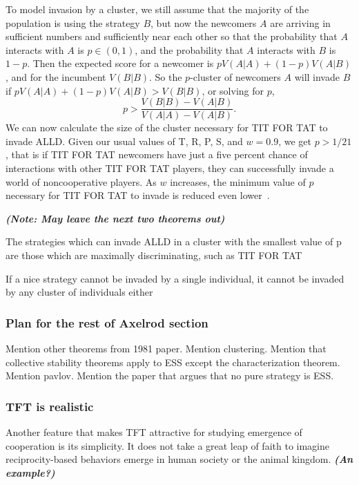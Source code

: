 To model invasion by a cluster, we still assume that the majority of the population is using the strategy $B$, but now the newcomers $A$ are arriving in sufficient numbers and sufficiently near each other so that the probability that $A$ interacts with $A$ is $p \in (0, 1)$, and the probability that $A$ interacts with $B$ is $1-p$. Then the expected score for a newcomer is $pV(A | A) + (1-p) V(A | B)$, and for the incumbent $V(B | B)$. So the $p$-cluster of newcomers $A$ will invade $B$ if $pV(A | A) + (1-p) V(A | B) > V(B|B)$, or solving for $p$,
\[
p > \frac{V(B|B) - V(A|B)}{V(A|A) - V(A|B)}.
\]
We can now calculate the size of the cluster necessary for TIT FOR TAT to invade ALLD. Given our usual values of T, R, P, S, and $w = 0.9$, we get $p > 1/21$, that is if TIT FOR TAT newcomers have just a five percent chance of interactions with other TIT FOR TAT players, they can successfully invade a world of noncooperative players. As $w$ increases, the minimum value of $p$ necessary for TIT FOR TAT to invade is reduced even lower~\cite{RobertAxelrod_1981}.

\textit{\textbf{(Note: May leave the next two theorems out)}}
\begin{theorem}\label{thm:alld_stable}
The strategies which can invade ALLD in a cluster with the smallest value of p are those which are maximally discriminating, such as TIT FOR TAT~\cite[Theorem 7]{RobertAxelrod_1981}
\end{theorem}

\begin{theorem}\label{thm:alld_stable}
If a nice strategy cannot be invaded by a single individual, it cannot be invaded by any cluster of individuals either~\cite[Theorem 8]{RobertAxelrod_1981}
\end{theorem}

\subsubsection{Plan for the rest of Axelrod section}
Mention other theorems from 1981 paper. Mention clustering. Mention that collective stability theorems apply to ESS except the characterization theorem. Mention pavlov. Mention the paper that argues that no pure strategy is ESS.


\subsubsection{TFT is realistic}
Another feature that makes TFT attractive for studying emergence of cooperation is its simplicity. It does not take a great leap of faith to imagine reciprocity-based behaviors emerge in human society or the animal kingdom. \textit{\textbf{(An example?)}}

